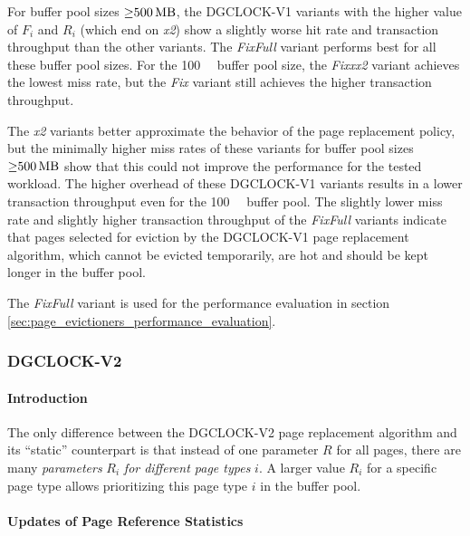     For buffer pool sizes $\mathord{\geq}\SI{500}{\mega\byte}$, the DGCLOCK-V1 variants with the higher value of $F_i$ and $R_i$ (which end on \emph{x2}) show a slightly worse hit rate and transaction throughput than the other variants. The \emph{FixFull} variant performs best for all these buffer pool sizes. For the \SI{100}{\mega\byte} buffer pool size, the \emph{Fixxx2} variant achieves the lowest miss rate, but the \emph{Fix} variant still achieves the higher transaction throughput.

    The \emph{x2} variants better approximate the behavior of the  page replacement policy, but the minimally higher miss rates of these variants for buffer pool sizes $\mathord{\geq}\SI{500}{\mega\byte}$ show that this could not improve the performance for the tested workload. The higher overhead of these DGCLOCK-V1 variants results in a lower transaction throughput even for the \SI{100}{\mega\byte} buffer pool. The slightly lower miss rate and slightly higher transaction throughput of the \emph{FixFull} variants indicate that pages selected for eviction by the DGCLOCK-V1 page replacement algorithm, which cannot be evicted temporarily, are hot and should be kept longer in the buffer pool.

    The \emph{FixFull} variant is used for the performance evaluation in section \ref{sec:page_evictioners_performance_evaluation}.

\subsubsection{DGCLOCK-V2} \label{subsubsec:dgclock-v2}

\paragraph{Introduction}

    The only difference between the DGCLOCK-V2 page replacement algorithm and its ``static'' counterpart  is that instead of one parameter $R$ for all pages, there are many \emph{parameters} $R_i$ \emph{for different page types} $i$. A larger value $R_i$ for a specific page type allows prioritizing this page type $i$ in the buffer pool.

\paragraph{Updates of Page Reference Statistics}

